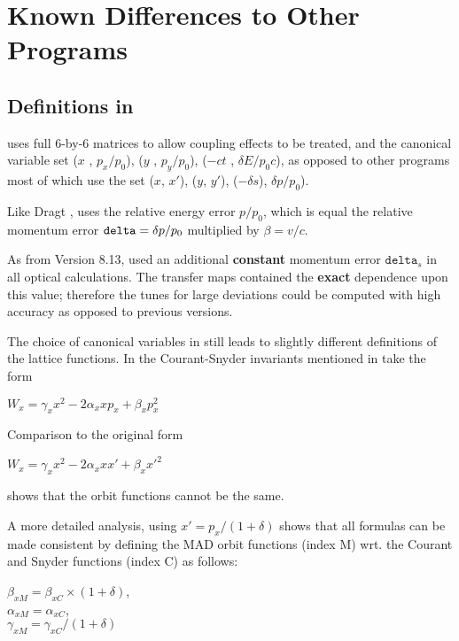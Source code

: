 
\chapter{Known Differences to Other Programs}
\label{chap:differences}

\section{Definitions in \madeight}
\label{sec:mad8_definitions}

\madeight uses full 6-by-6 matrices to allow coupling effects to be treated,
and the canonical variable set ($x$ , $p_x / p_0$),
($y$ , $p_y / p_0$), ($-ct$ , $\delta E / p_0 c$), as opposed to other
programs most of which use the set ($x$, $x'$), ($y$, $y'$),
($-\delta s$), $\delta p / p_0$). 

Like Dragt \cite{dragt1982}, \madeight uses the relative
energy error $p / p_0$, which is equal the relative momentum error
${\tt delta} = \delta p / p_0$ multiplied by $\beta = v/c$.  

As from Version 8.13, \madeight used an additional \textbf{constant}
momentum error $\texttt{delta}_s$ in all optical calculations. 
The transfer maps contained the \textbf{exact} dependence upon this
value; therefore the tunes for large deviations could be computed with
high accuracy as opposed to previous versions.  
 
The choice of canonical variables in \madx still leads to slightly
different definitions of the lattice functions. In \madx the
Courant-Snyder invariants mentioned in \cite{Courant_Snyder1958} take
the form  

$W_x = \gamma_x x^2 - 2 \alpha_x x p_x + \beta_x  p_x^2$

Comparison to the original form 

$W_x = \gamma_x x^2 - 2 \alpha_x x x' + \beta_x  {x'}^2$

shows that the orbit functions cannot be the same. 

A more detailed analysis, using 
$x' = p_x / (1 + \delta)$
shows that all formulas can be made consistent by defining the MAD orbit
functions (index M) wrt. the Courant and Snyder functions (index C) as follows:

$\beta_{xM} = \beta_{xC} \times (1 + \delta)$, \\
$\alpha_{xM} = \alpha_{xC}$, \\
$\gamma_{xM} = \gamma_{xC} / (1 + \delta)$

